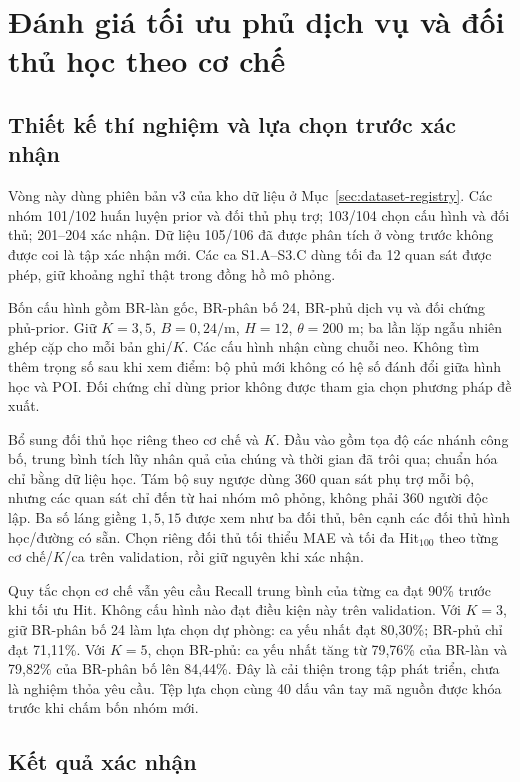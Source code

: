 \begingroup
{}
\section{Đánh giá tối ưu phủ dịch vụ và đối thủ học theo cơ chế}
\label{sec:service-cover-experiment}

\subsection{Thiết kế thí nghiệm và lựa chọn trước xác nhận}

Vòng này dùng phiên bản v3 của kho dữ liệu ở Mục~\ref{sec:dataset-registry}. Các nhóm 101/102 huấn luyện prior và đối thủ phụ trợ; 103/104 chọn cấu hình và đối thủ; 201--204 xác nhận. Dữ liệu 105/106 đã được phân tích ở vòng trước không được coi là tập xác nhận mới. Các ca S1.A--S3.C dùng tối đa 12 quan sát được phép, giữ khoảng nghỉ thật trong đồng hồ mô phỏng.

Bốn cấu hình gồm BR-làn gốc, BR-phân bố 24, BR-phủ dịch vụ và đối chứng phủ-prior. Giữ $K=3,5$, $B=0{,}24/\mathrm m$, $H=12$, $\theta=200$ m; ba lần lặp ngẫu nhiên ghép cặp cho mỗi bản ghi/$K$. Các cấu hình nhận cùng chuỗi neo. Không tìm thêm trọng số sau khi xem điểm: bộ phủ mới không có hệ số đánh đổi giữa hình học và POI. Đối chứng chỉ dùng prior không được tham gia chọn phương pháp đề xuất.

Bổ sung đối thủ học riêng theo cơ chế và $K$. Đầu vào gồm tọa độ các nhánh công bố, trung bình tích lũy nhân quả của chúng và thời gian đã trôi qua; chuẩn hóa chỉ bằng dữ liệu học. Tám bộ suy ngược dùng 360 quan sát phụ trợ mỗi bộ, nhưng các quan sát chỉ đến từ hai nhóm mô phỏng, không phải 360 người độc lập. Ba số láng giềng $1,5,15$ được xem như ba đối thủ, bên cạnh các đối thủ hình học/đường có sẵn. Chọn riêng đối thủ tối thiểu MAE và tối đa Hit$_{100}$ theo từng cơ chế/$K$/ca trên validation, rồi giữ nguyên khi xác nhận.

Quy tắc chọn cơ chế vẫn yêu cầu Recall trung bình của từng ca đạt 90\% trước khi tối ưu Hit. Không cấu hình nào đạt điều kiện này trên validation. Với $K=3$, giữ BR-phân bố 24 làm lựa chọn dự phòng: ca yếu nhất đạt 80,30\%; BR-phủ chỉ đạt 71,11\%. Với $K=5$, chọn BR-phủ: ca yếu nhất tăng từ 79,76\% của BR-làn và 79,82\% của BR-phân bố lên 84,44\%. Đây là cải thiện trong tập phát triển, chưa là nghiệm thỏa yêu cầu. Tệp lựa chọn cùng 40 dấu vân tay mã nguồn được khóa trước khi chấm bốn nhóm mới.

\subsection{Kết quả xác nhận}


